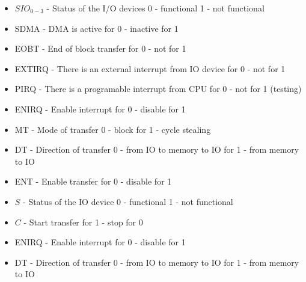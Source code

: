 \begin{table}[H]
    \begin{itemize}
        \item $SIO_{0-3}$ - Status of the I/O devices 0 - functional 1 - not functional
        \item SDMA - DMA is active for 0 - inactive for 1
        \item EOBT - End of block transfer for 0 - not for 1
        \item EXTIRQ - There is an external interrupt from IO device for 0 - not for 1
        \item PIRQ - There is a programable interrupt from CPU for 0 - not for 1 (testing)
        \item ENIRQ - Enable interrupt for 0 - disable for 1
        \item MT - Mode of transfer 0 - block for 1 - cycle stealing
        \item DT - Direction of transfer 0 - from IO to memory to IO for 1 - from memory to IO
        \item ENT - Enable transfer for 0 - disable for 1
    \end{itemize}
    \caption{SCDMA Register}
\end{table}


\begin{table}[H]
    \begin{itemize}
        \item $S$ - Status of the IO device 0 - functional 1 - not functional
        \item $C$ - Start transfer for 1 - stop for 0
        \item ENIRQ - Enable interrupt for 0 - disable for 1
        \item DT - Direction of transfer 0 - from IO to memory to IO for 1 - from memory to IO
    \end{itemize}
    \caption{SCIOX Register}
\end{table}


